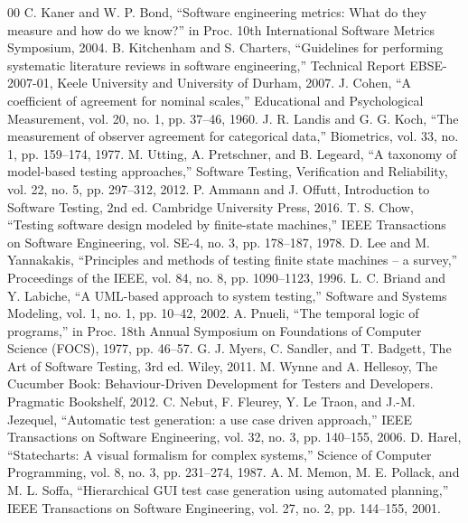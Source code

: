 \documentclass[conference]{IEEEtran}
\begin{document}
\begin{thebibliography}{00}
 C. Kaner and W. P. Bond, ``Software engineering metrics: What do they measure and how do we know?'' in Proc. 10th International Software Metrics Symposium, 2004.
 B. Kitchenham and S. Charters, ``Guidelines for performing systematic literature reviews in software engineering,'' Technical Report EBSE-2007-01, Keele University and University of Durham, 2007.
 J. Cohen, ``A coefficient of agreement for nominal scales,'' Educational and Psychological Measurement, vol. 20, no. 1, pp. 37--46, 1960.
 J. R. Landis and G. G. Koch, ``The measurement of observer agreement for categorical data,'' Biometrics, vol. 33, no. 1, pp. 159--174, 1977.
 M. Utting, A. Pretschner, and B. Legeard, ``A taxonomy of model-based testing approaches,'' Software Testing, Verification and Reliability, vol. 22, no. 5, pp. 297--312, 2012.
 P. Ammann and J. Offutt, Introduction to Software Testing, 2nd ed. Cambridge University Press, 2016.
 T. S. Chow, ``Testing software design modeled by finite-state machines,'' IEEE Transactions on Software Engineering, vol. SE-4, no. 3, pp. 178--187, 1978.
 D. Lee and M. Yannakakis, ``Principles and methods of testing finite state machines -- a survey,'' Proceedings of the IEEE, vol. 84, no. 8, pp. 1090--1123, 1996.
 L. C. Briand and Y. Labiche, ``A UML-based approach to system testing,'' Software and Systems Modeling, vol. 1, no. 1, pp. 10--42, 2002.
 A. Pnueli, ``The temporal logic of programs,'' in Proc. 18th Annual Symposium on Foundations of Computer Science (FOCS), 1977, pp. 46--57.
 G. J. Myers, C. Sandler, and T. Badgett, The Art of Software Testing, 3rd ed. Wiley, 2011.
 M. Wynne and A. Hellesoy, The Cucumber Book: Behaviour-Driven Development for Testers and Developers. Pragmatic Bookshelf, 2012.
 C. Nebut, F. Fleurey, Y. Le Traon, and J.-M. Jezequel, ``Automatic test generation: a use case driven approach,'' IEEE Transactions on Software Engineering, vol. 32, no. 3, pp. 140--155, 2006.
 D. Harel, ``Statecharts: A visual formalism for complex systems,'' Science of Computer Programming, vol. 8, no. 3, pp. 231--274, 1987.
 A. M. Memon, M. E. Pollack, and M. L. Soffa, ``Hierarchical GUI test case generation using automated planning,'' IEEE Transactions on Software Engineering, vol. 27, no. 2, pp. 144--155, 2001.

\end{thebibliography}
\end{document}

